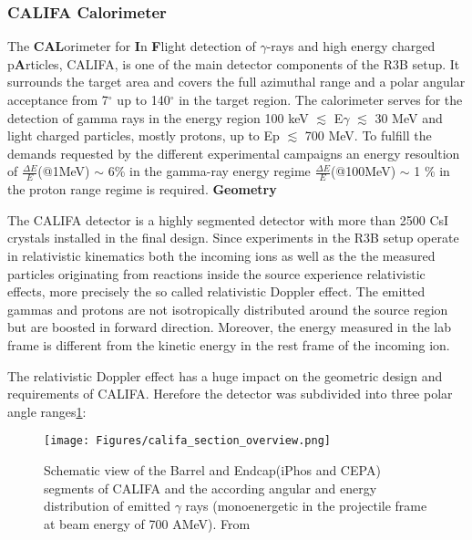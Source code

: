 \subsubsection{CALIFA Calorimeter}
The \textbf{CAL}orimeter for \textbf{I}n \textbf{F}light detection of $\gamma$-rays and high energy charged p\textbf{A}rticles, CALIFA, is one of the main detector components of the R3B setup. It surrounds the target area and covers the full azimuthal range and a polar angular acceptance from 7$^{\circ}$ up to 140$^{\circ}$ in the target region. The calorimeter serves for the detection of gamma rays in the energy region 100 keV $\lesssim$ E\textunderscore$\gamma$ $\lesssim$ 30 MeV and light charged particles, mostly protons, up to E\textunderscore p $\lesssim$ 700 MeV. To fulfill the demands requested by the different experimental campaigns an energy resoultion of $\frac{\Delta E}{E}$(@1MeV) $\sim$ 6\% in the gamma-ray energy regime $\frac{\Delta E}{E}$(@100MeV) $\sim$ 1 \% in the proton range regime is required.\newline
%
\textbf{Geometry}\newline

The CALIFA detector is a highly segmented detector with more than 2500 CsI crystals installed in the final design. Since experiments in the R3B setup operate in relativistic kinematics both the incoming ions as well as the the measured particles originating from reactions inside the source experience relativistic effects, more precisely the so called relativistic Doppler effect. The emitted gammas and protons are not isotropically distributed around the source region but are boosted in forward direction. Moreover, the energy measured in the lab frame is different from the kinetic energy in the rest frame of the incoming ion.\newline

The relativistic Doppler effect has a huge impact on the geometric design and requirements of CALIFA. Herefore the detector was subdivided into three polar angle ranges\ref{fig:califa_sec}:
\begin{figure}[htpb]
    \centering
    \texttt{[image: Figures/califa\_section\_overview.png]}
    \caption{
    Schematic view of the Barrel and Endcap(iPhos and CEPA) segments of CALIFA and the according angular and energy distribution of emitted $\gamma$ rays (monoenergetic in the projectile frame at beam energy of 700 AMeV). From \cite{tdr:barrel}
    }
    \label{fig:califa_sec}
\end{figure}

